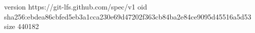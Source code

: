 version https://git-lfs.github.com/spec/v1
oid sha256:ebdea86cbfed5eb3a1cca230e69d47202f363cb84ba2e84ce9095d45516a5d53
size 440182
